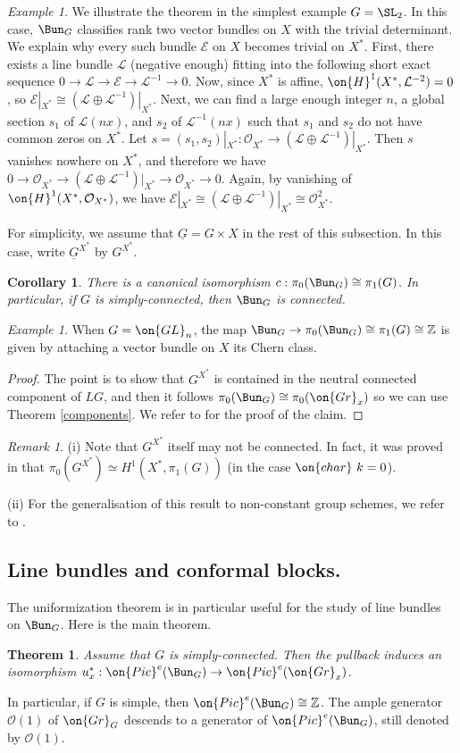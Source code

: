 \documentclass[]{pcmi}
\theoremstyle{plain}
\newtheorem{thm}[equation]{Theorem}
\newtheorem{cor}[equation]{Corollary}
\theoremstyle{remark}
\newtheorem{ex}[equation]{Example}
\newtheorem{rmk}[equation]{Remark}
\theoremstyle{definition}
\newcommand{\bZ}{{\mathbb Z}}
\newcommand{\mE}{{\mathcal E}}
\newcommand{\mL}{{\mathcal L}}
\newcommand{\mO}{{\mathcal O}}
\newcommand{\cha}{{\on{char}}}
\newcommand{\Gr}{{\on{Gr}}}
\newcommand{\Pic}{{\on{Pic}}}
\newcommand{\GL}{{\on{GL}}}
\begin{document}
\begin{ex}We illustrate the theorem in the simplest example $G=\SL_2$. In this case, $\Bun_G$ classifies rank two vector bundles on $X$ with the trivial determinant. We explain why every such bundle $\mE$ on $X$ becomes trivial on $X^*$. First, there exists a line bundle $\mL$ (negative enough) fitting into the following short exact sequence $0\to \mL\to \mE\to \mL^{-1}\to 0$. Now, since $X^*$ is affine, $\on{H}^1(X^*,\mL^{-2})=0$, so $\mE|_{X^*}\cong (\mL\oplus\mL^{-1})|_{X^*}$. 
Next, we can find a large enough integer $n$, a global section $s_1$ of $\mL(nx)$, and $s_2$ of $\mL^{-1}(nx)$ such that $s_1$ and $s_2$ do not have common zeros on $X^*$. Let $s=(s_1,s_2)|_{X^*}:\mO_{X^*}\to (\mL\oplus\mL^{-1})|_{X^*}$. Then $s$ vanishes nowhere on $X^*$, and therefore we have $0\to \mO_{X^*}\to (\mL\oplus\mL^{-1})|_{X^*}\to \mO_{X^*}\to 0$. Again, by vanishing of $\on{H}^1(X^*,\mO_{X^*})$, we have $\mE|_{X^*}\cong (\mL\oplus\mL^{-1})|_{X^*}\cong \mO_{X^*}^2$.
\end{ex}

For simplicity, we assume that $\underline G=G\times X$ in the rest of this subsection. In this case, write $\underline G^{X^*}$ by $G^{X^*}$.
\begin{cor}
There is a canonical isomorphism $c:\pi_0(\Bun_G)\cong \pi_1(G)$. In particular, if $G$ is simply-connected, then $\Bun_G$ is connected.
\end{cor}
\begin{ex} When $G=\GL_n$, the map $\Bun_G\to \pi_0(\Bun_G)\cong\pi_1(G)\cong \bZ$ is given by attaching a vector bundle on $X$ its Chern class.\end{ex}
\begin{proof}
The point is to show that $G^{X^*}$ is contained in the neutral connected component of $LG$, and then it follows $\pi_0(\Bun_G)\cong \pi_0(\Gr_{x})$ so we can use Theorem \ref{components}. We refer to \cite[(1.2)]{BLS} for the proof of the claim.
\end{proof}
\begin{rmk}(i) Note that $G^{X^*}$ itself may not be connected. In fact, it was proved in \cite{BLS} that $\pi_0(G^{X^*})\simeq H^1(X^*,\pi_1(G))$ (in the case $\cha\ k=0$). 

(ii) For the generalisation of this result to non-constant group schemes, we refer to \cite{He}.
\end{rmk}

\subsection{Line bundles and conformal blocks.}
The uniformization theorem is in particular useful for the study of line bundles on $\Bun_G$. Here is the main theorem. 
\begin{thm}\label{uniformize line}
Assume that $G$ is simply-connected. Then the pullback induces an isomorphism $u_x^*:\Pic^e(\Bun_G)\to \Pic^e(\Gr_x)$.
\end{thm}
In particular, if $G$ is simple, then $\Pic^e(\Bun_G)\cong\bZ$. The ample generator $\mO(1)$ of $\Gr_G$ descends to a generator of $\Pic^e(\Bun_G)$, still denoted by $\mO(1)$.
\end{document}
